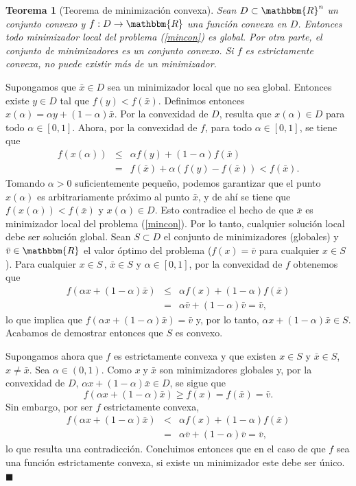 \documentclass[a4paper,12pt]{report}
\newcommand{\RR}{\mathbbm{R}}
\newcommand{\Rn}{\RR^n}
\newcommand{\bx}{\bar{x}}
\newcommand{\arr}{\rightarrow}
\newtheorem{teo}{Teorema}[section]
\newenvironment{dem}{\vspace*{-0.1cm}{\it Demostraci\'on:}}{\hfill
$\blacksquare$\\}
\begin{document}
\begin{teo}[Teorema de minimizaci\'on convexa]
Sean $D\subset\Rn$ un conjunto convexo y $f:D\arr\RR$ una funci\'on convexa en $D$.
Entonces todo minimizador local del problema (\ref{mincon}) es global. Por otra parte, el conjunto de minimizadores es un conjunto convexo.
Si $f$ es estrictamente convexa, no puede existir m\'as de un minimizador.
\end{teo}
\begin{dem}
Supongamos que $\bx\in D$ sea un minimizador local que no sea global. Entonces existe $y\in D$ tal que $f(y)< f(\bx)$.
Definimos entonces $x(\alpha)=\alpha y+(1-\alpha)\bx$. Por la convexidad de $D$, resulta que $x(\alpha)\in D$ para todo $\alpha\in[0,1]$. Ahora, por la convexidad de $f$, para todo $\alpha\in[0,1]$, se tiene que
\begin{eqnarray*}
f(x(\alpha))&\leq&\alpha f(y)+(1-\alpha)f(\bx)\\
&=&f(\bx)+\alpha(f(y)-f(\bx))<f(\bx).
\end{eqnarray*}
Tomando $\alpha>0$ suficientemente peque\~no, podemos garantizar que el punto $x(\alpha)$ es arbitrariamente pr\'oximo al punto $\bx$, y de ah\'i se tiene que $f(x(\alpha))<f(\bx)$ y $x(\alpha)\in D$. Esto contradice el hecho de que $\bx$ es minimizador local del problema (\ref{mincon}). Por lo tanto, cualquier soluci\'on local debe ser soluci\'on global. Sean $S\subset D$ el conjunto de minimizadores (globales) y $\bar{v}\in\RR$ el valor \'optimo del problema ($f(x)=\bar{v}$ para cualquier $x\in S$). Para cualquier $x\in S\, , \, \bx\in S$ y $\alpha\in[0,1]$, por la convexidad de $f$ obtenemos que
\begin{eqnarray*}
f(\alpha x+(1-\alpha)\bx)&\leq&\alpha f(x)+(1-\alpha)f(\bx)\\
&=&\alpha\bar{v}+(1-\alpha)\bar{v}=\bar{v},
\end{eqnarray*}
lo que implica que $f(\alpha x+(1-\alpha)\bx)=\bar{v}$ y, por lo tanto, $\alpha x+(1-\alpha)\bx\in S$. Acabamos de demostrar entonces que $S$ es convexo.

Supongamos ahora que $f$ es estrictamente convexa y que existen $x\in S$ y $\bx\in S$, $x\neq\bx$. Sea $\alpha\in(0,1)$. Como $x\;\mbox{y}\;\bx$ son minimizadores globales y, por la convexidad de $D$, $\alpha x+(1-\alpha)\bx\in D$, se sigue que
$$f(\alpha x+(1-\alpha)\bx)\geq f(x)=f(\bx)=\bar{v}.$$
Sin embargo, por ser $f$ estrictamente convexa,
\begin{eqnarray*}
f(\alpha x+(1-\alpha)\bx)&<&\alpha f(x)+(1-\alpha)f(\bx)\\
&=&\alpha\bar{v}+(1-\alpha)\bar{v}=\bar{v},
\end{eqnarray*}
lo que resulta una contradicci\'on. Concluimos entonces que en el caso de que $f$ sea una funci\'on estrictamente convexa, si existe un minimizador este debe ser \'unico.
\end{dem}
\end{document}
